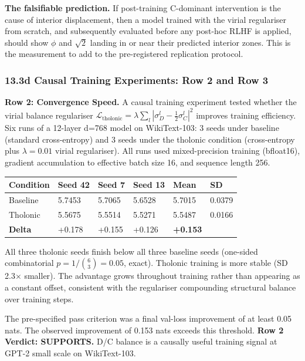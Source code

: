 \documentclass[12pt]{article}
\begin{document}
\textbf{The falsifiable prediction.} If post-training C-dominant
intervention is the cause of interior displacement, then a model trained
with the virial regulariser from scratch, and subsequently evaluated
before any post-hoc RLHF is applied, should show \(\phi\) and
\(\sqrt{2}\) landing in or near their predicted interior zones. This is
the measurement to add to the pre-registered replication protocol.

\subsubsection{13.3d Causal Training Experiments: Row 2 and Row
3}\label{d-causal-training-experiments-row-2-and-row-3}

\textbf{Row 2: Convergence Speed.} A causal training experiment tested
whether the virial balance regulariser
\(\mathcal{L}_{\text{tholonic}} = \lambda \sum_l |\sigma_D^l - \frac{1}{2}\sigma_C^l|^2\)
improves training efficiency. Six runs of a 12-layer d=768 model on
WikiText-103: 3 seeds under baseline (standard cross-entropy) and 3
seeds under the tholonic condition (cross-entropy plus \(\lambda=0.01\)
virial regulariser). All runs used mixed-precision training (bfloat16),
gradient accumulation to effective batch size 16, and sequence length
256.

\begin{longtable}[]{@{}llllll@{}}
\toprule\noalign{}
Condition & Seed 42 & Seed 7 & Seed 13 & Mean & SD \\
\midrule\noalign{}
\endhead
\bottomrule\noalign{}
\endlastfoot
Baseline & 5.7453 & 5.7065 & 5.6528 & 5.7015 & 0.0379 \\
Tholonic & 5.5675 & 5.5514 & 5.5271 & 5.5487 & 0.0166 \\
\textbf{Delta} & +0.178 & +0.155 & +0.126 & \textbf{+0.153} & \\
\end{longtable}

All three tholonic seeds finish below all three baseline seeds
(one-sided combinatorial \(p = 1/\binom{6}{3} = 0.05\), exact). Tholonic
training is more stable (SD 2.3× smaller). The advantage grows
throughout training rather than appearing as a constant offset,
consistent with the regulariser compounding structural balance over
training steps.

The pre-specified pass criterion was a final val-loss improvement of at
least 0.05 nats. The observed improvement of 0.153 nats exceeds this
threshold. \textbf{Row 2 Verdict: SUPPORTS.} D/C balance is a causally
useful training signal at GPT-2 small scale on WikiText-103.
\end{document}
